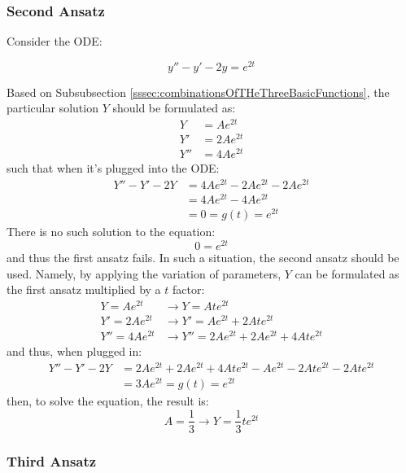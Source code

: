 \documentclass[12pt]{article}
\begin{document}
\subsubsection{Second Ansatz}
\label{sssec:secondAnsatz}

Consider the ODE:

\begin{equation*}
  y''-y'-2y = e^{2t}
\end{equation*}

Based on Subsubsection \ref{sssec:combinationsOfTHeThreeBasicFunctions}, the particular solution $Y$ should be formulated as:
\begin{align*}
  Y   &= Ae^{2t} \\
  Y'  &= 2Ae^{2t} \\
  Y'' &= 4Ae^{2t}
\end{align*}
such that when it's plugged into the ODE:
\begin{align*}
  Y'' - Y' - 2Y &= 4Ae^{2t} - 2Ae^{2t} - 2Ae^{2t} \\
                &= 4Ae^{2t} - 4Ae^{2t} \\
                &= 0 = g(t) = e^{2t}
\end{align*}
There is no such solution to the equation:
\begin{equation*}
  0 = e^{2t}
\end{equation*}
and thus the first ansatz fails. In such a situation, the second ansatz should be used. Namely, by applying the variation of parameters, $Y$ can be formulated as the first ansatz multiplied by a $t$ factor:
\begin{align*}
  Y   = Ae^{2t}    &\rightarrow Y   = Ate^{2t} \\
  Y'  = 2Ae^{2t}  &\rightarrow  Y'  = Ae^{2t} + 2Ate^{2t} \\
  Y'' = 4Ae^{2t} &\rightarrow   Y'' = 2Ae^{2t} + 2Ae^{2t} + 4Ate^{2t}
\end{align*}
and thus, when plugged in:
\begin{align*}
  Y'' - Y' - 2Y &= 2Ae^{2t} + 2Ae^{2t} + 4Ate^{2t} - Ae^{2t} - 2Ate^{2t} - 2Ate^{2t} \\
                &= 3Ae^{2t} = g(t) = e^{2t}
\end{align*}
then, to solve the equation, the result is:
\begin{equation*}
  A = \frac{1}{3} \rightarrow Y = \frac{1}{3}te^{2t}
\end{equation*}

\subsubsection{Third Ansatz}
\label{sssec:thirdAnsatz}
\end{document}
